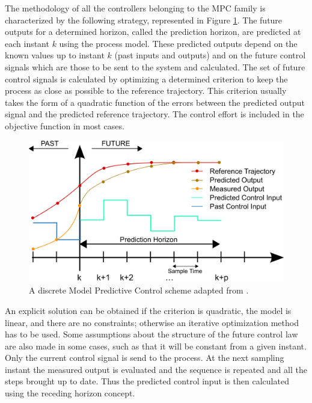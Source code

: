 The methodology of all the controllers belonging to the MPC family is characterized by the following strategy, represented in Figure \ref{fig:mpc_theory}. The future outputs for a  determined horizon, called  the  prediction horizon, are predicted at each instant $k$ using the process model. These predicted outputs depend on the known values up to instant $k$ (past inputs and outputs) and on the future control signals which are those to be sent to the system and calculated. The set of future control signals is calculated by optimizing a determined criterion to keep the process as close as possible to the reference trajectory. This criterion usually takes the form of a quadratic function of the errors between the predicted output signal and the predicted reference trajectory. The control effort is included in the objective function in most
cases. 
\begin{figure}[!h]
	\centering
	\includegraphics[width=\textwidth]{./figure/mpc_theory.png}
	\caption{A discrete Model Predictive Control scheme adapted from \cite{mpctoolbox}.}
	\label{fig:mpc_theory}
\end{figure}

An explicit solution can be obtained if the criterion is quadratic, the model is linear, and there are no constraints; otherwise an iterative optimization method has to be used. Some assumptions about the structure of the future control law are also made in some cases, such as that it will be constant from a given instant. Only the current control signal is send to the process. At the next sampling instant the measured output is evaluated and the sequence is repeated and all the steps brought up to date. Thus the predicted control input is then calculated using the receding horizon concept.


